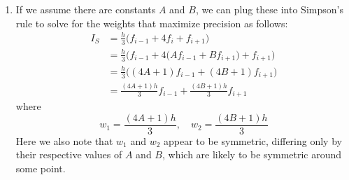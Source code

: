 \documentclass[11pt,a4paper]{article}
\begin{document}
\begin{itemize}
\begin{enumerate} [label={\alph*)}]
\begin{align*}
						&= \frac{h}{3}\Big(f_{i-1} + 2\big(f_{i+1}+f_{i-1}\big) + f_{i+1}\Big) \\
						&= \frac{h}{3}\Big(3f_{i-1} + 3f_{i+1}\Big) \\
						&= h\Big(f_{i-1} + f_{i+1}\Big)
					\end{align*}
					We see this is the same result we reached in part (a)
					\item If we assume there are constants $A$ and $B$, we can plug these into Simpson's rule to solve for the weights that maximize precision as follows:
					\begin{align*}
						I_S &= \frac{h}{3}\Big(f_{i-1} + 4f_i + f_{i+1}\Big) \\
						&= \frac{h}{3}\Big(f_{i-1} + 4\big(Af_{i-1} + Bf_{i+1}\big) + f_{i+1}\Big) \\
						&= \frac{h}{3}\Big((4A+1)f_{i-1} + (4B+1)f_{i+1}\Big) \\
						&= \frac{(4A+1)h}{3}f_{i-1} + \frac{(4B+1)h}{3}f_{i+1}
					\end{align*}
					where $$w_1 = \frac{(4A+1)h}{3}, \quad w_2 = \frac{(4B+1)h}{3}$$ Here we also note that $w_1$ and $w_2$ appear to be symmetric, differing only by their respective values of $A$ and $B$, which are likely to be symmetric around some point.
					
				\end{enumerate}
				

\end{itemize}
\end{document}
